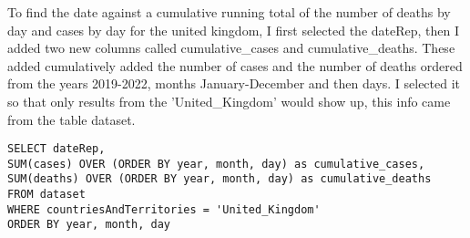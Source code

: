\documentclass[]{article}
\begin{document}
To find the date against a cumulative running total of the number of deaths by day and cases by day for the united kingdom, I first selected the dateRep, then I added two new columns called cumulative\_cases and cumulative\_deaths.
These added cumulatively added the number of cases and the number of deaths ordered from the years 2019-2022, months January-December and then days. I selected it so that only results from the 'United\_Kingdom' would show up, this info
came from the table dataset.

\begin{lstlisting}
SELECT dateRep,
SUM(cases) OVER (ORDER BY year, month, day) as cumulative_cases,
SUM(deaths) OVER (ORDER BY year, month, day) as cumulative_deaths
FROM dataset
WHERE countriesAndTerritories = 'United_Kingdom'
ORDER BY year, month, day
\end{lstlisting}
\end{document}
